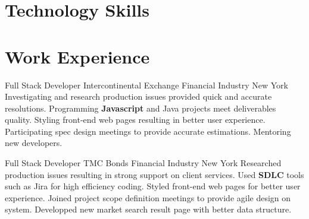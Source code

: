 \documentclass[11pt,a4paper,sans]{moderncv}   %
\begin{document}
\maketitle

\section{Technology Skills}


\section{Work Experience}
\renewcommand{\baselinestretch}{1.25}

{Full Stack Developer}
{Intercontinental Exchange}
{Financial Industry}
{New York}
{
	{Investigating and research production issues provided quick and accurate resolutions.}
	\newline
	{Programming \textbf{Javascript} and Java projects meet deliverables quality.}
	\newline
	{Styling front-end web pages resulting in better user experience.}
	\newline
    {Participating spec design meetings to provide accurate estimations.}
    \newline
    {Mentoring new developers.}
}

{Full Stack Developer}
{TMC Bonds}
{Financial Industry}
{New York}
{
	{Researched production issues resulting in strong support on client services.}
	\newline
	{Used \textbf{SDLC} tools such as Jira for high efficiency coding.}
	\newline
	{Styled front-end web pages for better user experience.}
	\newline
	{Joined project scope definition meetings to provide agile design on system.}
	\newline
	{Developped new market search result page with better data structure.}
}
\end{document}
